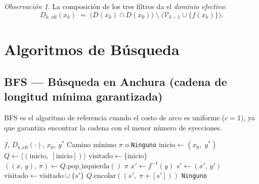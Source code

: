 \documentclass[12pt, a4paper]{article}
\theoremstyle{definition}
\theoremstyle{plain}
\theoremstyle{remark}
\newtheorem{remark}{Observación}[section]
\newcommand{\dom}[1]{D\!\left(#1\right)}
\newcommand{\domk}[2]{D_{#1}\!\left(#2\right)}
\newcommand{\inv}[1]{f^{-1}\!\left(#1\right)}
\begin{document}
\begin{remark}
  La composición de los tres filtros da el \emph{dominio efectivo}:
  \[
    \domk{k,\,\text{eff}}{x_k}
    \;=\;
    \bigl(\dom{x_k} \cap \dom{x_0}\bigr)
    \;\setminus\;
    \bigl(\mathcal{V}_{k-1} \cup \{f(x_k)\}\bigr).
  \]
\end{remark}

\section{Algoritmos de Búsqueda}

\subsection{BFS — Búsqueda en Anchura (cadena de longitud mínima garantizada)}

BFS es el algoritmo de referencia cuando el costo de arco es uniforme
($c = 1$), ya que garantiza encontrar la cadena con el menor número de
eyecciones.

\begin{algorithm}[H]
\caption{BFS para Ejection Chain Mínima}
\label{alg:bfs}
\begin{algorithmic}[1]
\Require $f$, $\domk{k,\text{eff}}{\cdot}$, $x_0$, $y^*$
\Ensure Camino mínimo $\pi$ o \texttt{Ninguno}
\State $\text{inicio} \leftarrow (x_0,\; y^*)$
\State $Q \leftarrow \langle (\text{inicio},\; [\text{inicio}]) \rangle$
\State $\text{visitado} \leftarrow \{\text{inicio}\}$
  \State $((x,\, y),\, \pi) \leftarrow Q.\text{pop\_izquierda}()$
    \Return $\pi$ 
  \EndIf
  \State $x' \leftarrow \inv{y}$
  \ForEach{$y' \in \domk{k,\text{eff}}{x'}$}
    \State $s' \leftarrow (x',\, y')$
      \State $\text{visitado} \leftarrow \text{visitado} \cup \{s'\}$
      \State $Q.\text{encolar}((s',\; \pi + [s']))$
    \EndIf
  \EndFor
\EndWhile
\Return \texttt{Ninguno}
\end{algorithmic}
\end{algorithm}
\end{document}

